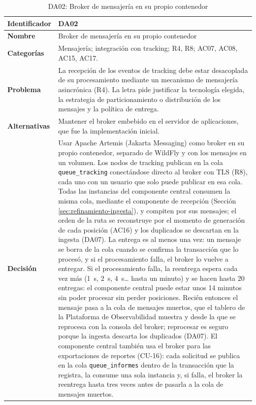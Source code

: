 \begin{table}[H]
    \small
    \centering
    \caption{DA02: Broker de mensajería en su propio contenedor}
    \label{tab:da02}
    \begin{tabular}{|p{4.1cm}|p{11.7cm}|}
        \hline
            \textbf{Identificador} & DA02 \\
        \hline
            \textbf{Nombre} & Broker de mensajería en su propio contenedor \\
        \hline
            \textbf{Categorías} & Mensajería; integración con tracking; R4, R8; AC07, AC08, AC15, AC17. \\
        \hline
            \textbf{Problema} & La recepción de los eventos de tracking debe estar desacoplada de su procesamiento mediante un mecanismo de mensajería asincrónica (R4). La letra pide justificar la tecnología elegida, la estrategia de particionamiento o distribución de los mensajes y la política de entrega. \\
        \hline
            \textbf{Alternativas} & Mantener el broker embebido en el servidor de aplicaciones, que fue la implementación inicial. \\
        \hline
            \textbf{Decisión} & Usar Apache Artemis (Jakarta Messaging) como broker en su propio contenedor, separado de WildFly y con los mensajes en un volumen. Los nodos de tracking publican en la cola \texttt{queue\_tracking} conectándose directo al broker con TLS (R8), cada uno con un usuario que solo puede publicar en esa cola. Todas las instancias del componente central consumen la misma cola, mediante el componente de recepción (Sección \ref{sec:refinamiento-ingesta}), y compiten por sus mensajes; el orden de la ruta se reconstruye por el momento de generación de cada posición (AC16) y los duplicados se descartan en la ingesta (DA07). La entrega es al menos una vez: un mensaje se borra de la cola cuando se confirma la transacción que lo procesó, y si el procesamiento falla, el broker lo vuelve a entregar. Si el procesamiento falla, la reentrega espera cada vez más (1~s, 2~s, 4~s\ldots{} hasta un minuto) y se hacen hasta 20 entregas: el componente central puede estar unos 14 minutos sin poder procesar sin perder posiciones. Recién entonces el mensaje pasa a la cola de mensajes muertos, que el tablero de la Plataforma de Observabilidad muestra y desde la que se reprocesa con la consola del broker; reprocesar es seguro porque la ingesta descarta los duplicados (DA07). El componente central también usa el broker para las exportaciones de reportes (CU-16): cada solicitud se publica en la cola \texttt{queue\_informes} dentro de la transacción que la registra, la consume una sola instancia y, si falla, el broker la reentrega hasta tres veces antes de pasarla a la cola de mensajes muertos. \\

\end{tabular}
\end{table}
